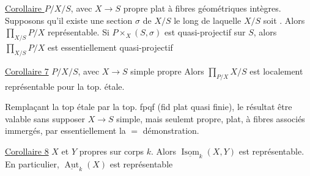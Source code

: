 \uline{Corollaire } $P/X/S$, avec $X\longrightarrow S$ propre plat à fibres géométriques intègres. Supposons qu'il existe une section $\sigma$ de $X/S$ le long de laquelle $X/S$ soit . Alors $\prod_{X/S}P/X$ représentable. Si $P\times_X(S,\sigma)$ est quasi-projectif sur $S$, alors $\prod_{X/S}P/X$ est essentiellement quasi-projectif

\uline{Corollaire 7} $P/X/S$, avec $X\to S$ simple propre   Alors $\prod_{P/X}X/S$ est localement représentable pour la top. étale.

Remplaçant la top étale par la top. fpqf (fid plat quasi finie), le résultat   être valable sans supposer $X\to S$ simple, mais seulemt propre, plat, à fibres  associés immergés, par essentiellement la $=$ démonstration.

\uline{Corollaire 8} $X$ et $Y$ propres sur  corps $k$. Alors $\underline{\operatorname{Isom}}_k(X,Y)$ est représentable. En particulier, $\underline{\operatorname{Aut}}_k(X)$ est représentable

